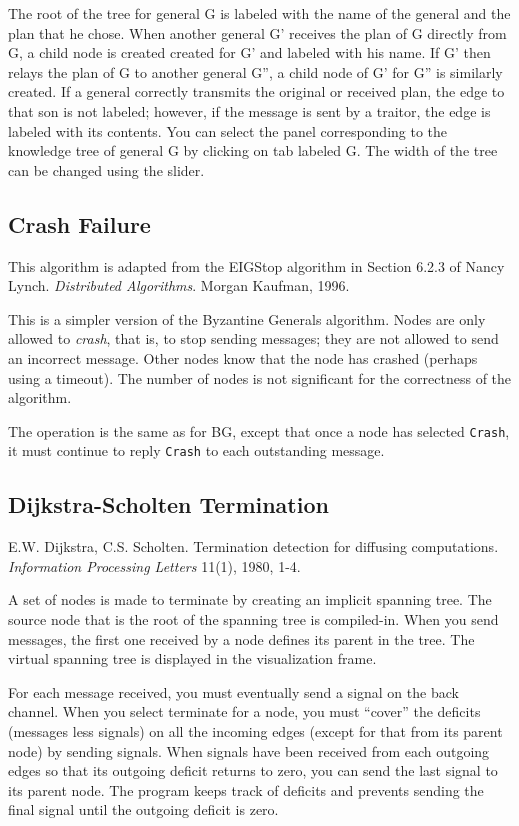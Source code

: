 \documentclass[11pt]{article}
\newcommand{\p}[1]{\texttt{#1}}
\begin{document}
The root of the tree for general G is labeled with the name
of the general and the plan that he chose.
When another general G' receives the plan of G directly from G,
a child node is created created for G' and labeled with his name.
If G' then relays the plan of G to another general G'',
a child node of G' for G'' is similarly created.
If a general correctly transmits the original or received plan,
the edge to that son is not labeled;
however, if the message is sent by a traitor, the edge is labeled with its contents.
You can select the panel corresponding to the
knowledge tree of general G by clicking on tab labeled G.
The width of the tree can be changed using the slider.

\subsection{Crash Failure}

This algorithm is adapted from the EIGStop algorithm in Section 6.2.3 of
Nancy Lynch. \emph{Distributed Algorithms}. Morgan Kaufman, 1996.

This is a simpler version of the Byzantine Generals algorithm.
Nodes are only allowed to \emph{crash}, that is, to stop sending
messages; they are not allowed to send an incorrect message.
Other nodes know that the node has crashed (perhaps using a
timeout). The number of nodes is not significant for the
correctness of the algorithm.

The operation is the same as for BG, except that once a node has
selected \p{Crash}, it must continue to reply \p{Crash} to each
outstanding message.

\subsection{Dijkstra-Scholten Termination}

E.W. Dijkstra, C.S. Scholten.
Termination detection for diffusing computations.
\emph{Information Processing Letters} 11(1), 1980, 1-4.

A set of nodes is made to terminate by creating an implicit
spanning tree. The source node that is the root of the spanning
tree is compiled-in. When you send messages, the first one
received by a node defines its parent in the tree.
The virtual spanning tree is displayed in the visualization frame.

For each message received, you must eventually send a signal on
the back channel. When you select terminate for a node, you must
``cover'' the deficits (messages less signals) on all the
incoming edges (except for that from its parent node) by sending
signals. When signals have been received from each outgoing
edges so that its outgoing deficit returns to zero, you can send
the last signal to its parent node.
The program keeps track of deficits and prevents sending the
final signal until the outgoing deficit is zero.
\end{document}
